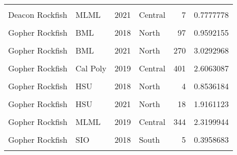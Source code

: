 \documentclass[
]{article}
\begin{document}
\begin{longtable}[t]{llrlrr}
\cellcolor{gray!6}{Deacon Rockfish} & \cellcolor{gray!6}{MLML} & \cellcolor{gray!6}{2019} & \cellcolor{gray!6}{Central} & \cellcolor{gray!6}{7} & \cellcolor{gray!6}{0.6737005}\\
\addlinespace
Deacon Rockfish & MLML & 2021 & Central & 7 & 0.7777778\\
\cellcolor{gray!6}{Freckled Rockfish} & \cellcolor{gray!6}{SIO} & \cellcolor{gray!6}{2018} & \cellcolor{gray!6}{South} & \cellcolor{gray!6}{1} & \cellcolor{gray!6}{0.5000000}\\
Gopher Rockfish & BML & 2018 & North & 97 & 0.9592155\\
\cellcolor{gray!6}{Gopher Rockfish} & \cellcolor{gray!6}{BML} & \cellcolor{gray!6}{2019} & \cellcolor{gray!6}{North} & \cellcolor{gray!6}{145} & \cellcolor{gray!6}{1.2936013}\\
Gopher Rockfish & BML & 2021 & North & 270 & 3.0292968\\
\addlinespace
\cellcolor{gray!6}{Gopher Rockfish} & \cellcolor{gray!6}{Cal Poly} & \cellcolor{gray!6}{2018} & \cellcolor{gray!6}{Central} & \cellcolor{gray!6}{290} & \cellcolor{gray!6}{1.8522091}\\
Gopher Rockfish & Cal Poly & 2019 & Central & 401 & 2.6063087\\
\cellcolor{gray!6}{Gopher Rockfish} & \cellcolor{gray!6}{Cal Poly} & \cellcolor{gray!6}{2021} & \cellcolor{gray!6}{Central} & \cellcolor{gray!6}{281} & \cellcolor{gray!6}{2.9146655}\\
Gopher Rockfish & HSU & 2018 & North & 4 & 0.8536184\\
\cellcolor{gray!6}{Gopher Rockfish} & \cellcolor{gray!6}{HSU} & \cellcolor{gray!6}{2019} & \cellcolor{gray!6}{North} & \cellcolor{gray!6}{3} & \cellcolor{gray!6}{1.5000000}\\
\addlinespace
Gopher Rockfish & HSU & 2021 & North & 18 & 1.9161123\\
\cellcolor{gray!6}{Gopher Rockfish} & \cellcolor{gray!6}{MLML} & \cellcolor{gray!6}{2018} & \cellcolor{gray!6}{Central} & \cellcolor{gray!6}{258} & \cellcolor{gray!6}{2.3885479}\\
Gopher Rockfish & MLML & 2019 & Central & 344 & 2.3199944\\
\cellcolor{gray!6}{Gopher Rockfish} & \cellcolor{gray!6}{MLML} & \cellcolor{gray!6}{2021} & \cellcolor{gray!6}{Central} & \cellcolor{gray!6}{409} & \cellcolor{gray!6}{2.6515707}\\
Gopher Rockfish & SIO & 2018 & South & 5 & 0.3958683\\
\addlinespace
\cellcolor{gray!6}{Gopher Rockfish} & \cellcolor{gray!6}{SIO} & \cellcolor{gray!6}{2019} & \cellcolor{gray!6}{South} & \cellcolor{gray!6}{8} & \cellcolor{gray!6}{0.3122450}\\

\end{longtable}
\end{document}
